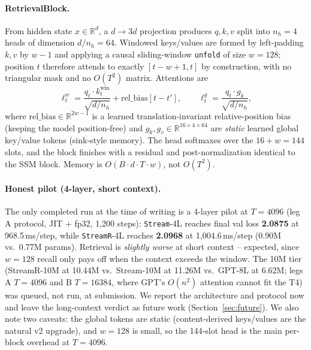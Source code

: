 \documentclass[11pt]{article}
\newcommand{\Stream}{\texttt{Stream}}
\newcommand{\StreamR}{\texttt{StreamR}}
\begin{document}
\paragraph{RetrievalBlock.}
From hidden state $x\in\mathbb{R}^d$, a $d\to3d$ projection produces $q,k,v$
split into $n_h{=}4$ heads of dimension $d/n_h{=}64$. Windowed keys/values are
formed by left-padding $k,v$ by $w{-}1$ and applying a causal sliding-window
\texttt{unfold} of size $w{=}128$; position $t$ therefore attends to exactly
$[t{-}w{+}1,t]$ by construction, with no triangular mask and no $O(T^2)$ matrix.
Attentions are
\begin{equation}
\ell^{w}_t=\frac{q_t\!\cdot\! k^{\text{win}}_t}{\sqrt{d/n_h}}+\mathrm{rel\_bias}[t{-}t'],
\qquad
\ell^{g}_t=\frac{q_t\!\cdot\! g_k}{\sqrt{d/n_h}},
\end{equation}
where $\mathrm{rel\_bias}\in\mathbb{R}^{2w{-}1}$ is a learned
translation-invariant relative-position bias (keeping the model position-free)
and $g_k,g_v\in\mathbb{R}^{16\times4\times64}$ are \emph{static} learned global
key/value tokens (sink-style memory). The head softmaxes over the $16{+}w{=}144$
slots, and the block finishes with a residual and post-normalization identical
to the SSM block. Memory is $O(B\!\cdot\! d\!\cdot\!T\!\cdot\! w)$, not $O(T^2)$.

\paragraph{Honest pilot (4-layer, short context).}
The only completed run at the time of writing is a 4-layer pilot at
$T{=}4096$ (leg A protocol, JIT + fp32, 1{,}200 steps): \Stream{}-4L reaches
final val loss \textbf{2.0875} at 968.5\,ms/step, while \StreamR{}-4L reaches
\textbf{2.0968} at 1{,}004.6\,ms/step (0.90M vs.\ 0.77M params). Retrieval is
\emph{slightly worse} at short context -- expected, since $w{=}128$ recall only
pays off when the context exceeds the window. The 10M tier (StreamR-10M at
10.44M vs.\ Stream-10M at 11.26M vs.\ GPT-8L at 6.62M; legs A $T{=}4096$ and B
$T{=}16384$, where GPT's $O(n^2)$ attention cannot fit the T4) was queued, not
run, at submission. We report the architecture and protocol now and leave the
long-context verdict as future work (Section~\ref{sec:future}). We also note
two caveats: the global tokens are static (content-derived keys/values are the
natural v2 upgrade), and $w{=}128$ is small, so the 144-slot head is the main
per-block overhead at $T{=}4096$.
\end{document}
